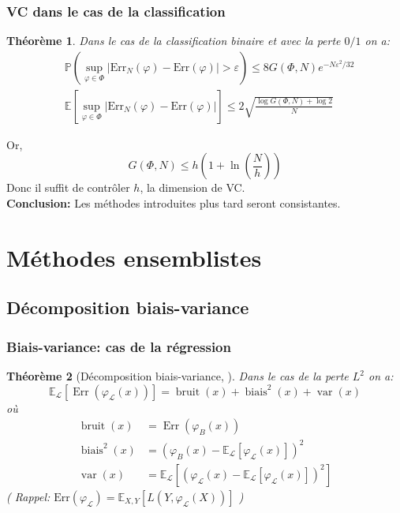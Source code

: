 \documentclass[dvipsnames,10pt]{beamer}
\theoremstyle{plain}
\newtheorem{theoreme}{Théorème}
\theoremstyle{definition}
\begin{document}
\begin{frame}
\frametitle{VC dans le cas de la classification}
\begin{theoreme}\label{thrm:vc}
    Dans le cas de la classification binaire et avec la perte $0/1$ on a:
    \begin{align}
        &\mathbb{P} \left( \sup_{\varphi \in \Phi} \vert \mathrm{Err}_N ( \varphi ) - \mathrm{Err} ( \varphi ) \vert > \varepsilon \right) \leq 8 G(\Phi,N) e^{-N \varepsilon^2 / 32} \\
        &\mathbb{E} \left[ \sup_{\varphi \in \Phi} \vert \mathrm{Err}_N ( \varphi ) - \mathrm{Err} ( \varphi ) \vert \right] \leq 2 \sqrt{\frac{\log G(\Phi,N) + \log 2 }{N}}
    \end{align}
\end{theoreme}
Or,
\begin{equation*}
    G(\Phi,N) \leq h \left( 1 + \ln \left( \frac{N}{h} \right) \right)
\end{equation*}
Donc il suffit de contrôler $h$, la dimension de VC. \\
\textbf{Conclusion:} Les méthodes introduites plus tard seront consistantes.
\end{frame}

\section{Méthodes ensemblistes}
\subsection{Décomposition biais-variance}

\begin{frame}
\frametitle{Biais-variance: cas de la régression}
\begin{theoreme}[Décomposition biais-variance, \cite{Geman1992}]
    Dans le cas de la perte $L^2$ on a:
    \begin{equation}
        \mathbb{E}_{\mathcal{L}} \left[ \operatorname{Err} ( \varphi_{\mathcal{L}} (x) ) \right] = \operatorname{bruit} (x) + \operatorname{biais}^2 (x) + \operatorname{var} (x)
    \end{equation}
    où
    \begin{align*}
        \operatorname{bruit} (x) &= \operatorname{Err} (\varphi_{B} (x) ) \\
        \operatorname{biais}^2 (x) &= ( \varphi_B (x) - \mathbb{E}_{\mathcal{L}} \left[ \varphi_{\mathcal{L}} (x) \right] )^2 \\
        \operatorname{var} (x) &= \mathbb{E}_{\mathcal{L}} \left[ \left( \varphi_{\mathcal{L}} (x) - \mathbb{E}_{\mathcal{L}} [ \varphi_{\mathcal{L}} (x) ] \right)^2 \right]
    \end{align*}
    ( Rappel: $\mathrm{Err}\left(\varphi_{\mathcal{L}}\right) = \mathbb{E}_{X,Y} \left[ L \left(Y,\varphi_{\mathcal{L}} \left(X \right) \right) \right]$ )
\end{theoreme}
\end{frame}
\end{document}
